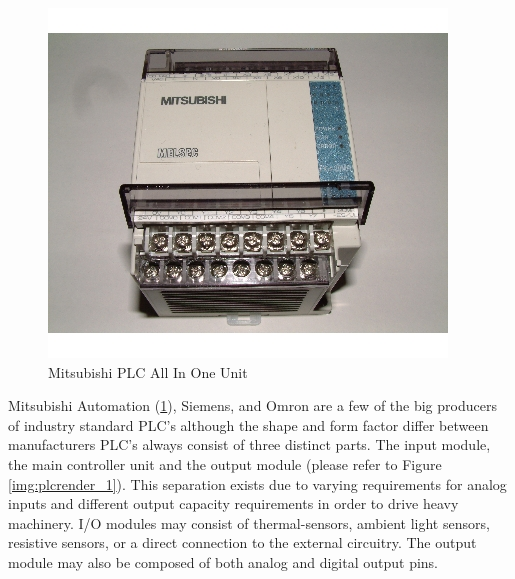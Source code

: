 \begin{figure}[htp]
    \centering
    \includegraphics[width=\imgsmlphoto]{./images/c01_mitsubishiplc.jpg}
    \caption{Mitsubishi PLC All In One Unit \cite{img_c01_MitsubishiPlc}}
    \label{img:mitsubishiplc}
\end{figure}
Mitsubishi Automation (\ref{img:mitsubishiplc}), Siemens, and Omron are a few of the big
 producers of industry standard PLC's although the shape and form factor differ between 
 manufacturers PLC's always consist of three distinct parts.  The input module, the main 
 controller unit and the output module (please refer to Figure \ref{img:plcrender_1}). 
 This separation exists due to varying requirements for analog inputs and different output 
 capacity requirements in order to drive heavy machinery. I/O modules may consist of 
 thermal-sensors, ambient light sensors, resistive sensors, or a direct connection to the 
 external circuitry. The output module may also be composed of both analog and digital output pins.
 
